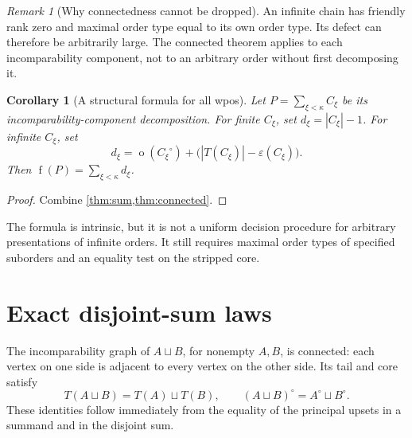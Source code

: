 \documentclass[11pt,a4paper]{article}
\newtheorem{corollary}[corollary]{Corollary}
\theoremstyle{definition}
\theoremstyle{remark}
\newtheorem{remark}[remark]{Remark}
\DeclareMathOperator{\mot}{o}
\DeclareMathOperator{\fot}{f}
\newcommand{\core}[1]{{#1}^{\circ}}
\newcommand{\ds}{\mathbin{\sqcup}}
\newcommand{\eps}{\varepsilon}
\begin{document}
\begin{remark}[Why connectedness cannot be dropped]
An infinite chain has friendly rank zero and maximal order type equal to
its own order type. Its defect can therefore be arbitrarily large. The
connected theorem applies to each incomparability component, not to an
arbitrary order without first decomposing it.
\end{remark}

\begin{corollary}[A structural formula for all wpos]\label{cor:all}
Let $P=\sum_{\xi<\kappa}C_\xi$ be its incomparability-component decomposition.
For finite $C_\xi$, set $d_\xi=|C_\xi|-1$. For infinite $C_\xi$, set
\[
d_\xi=\mot(\core{C_\xi})+
          \bigl(|T(C_\xi)|-\eps(C_\xi)\bigr).
\]
Then $\fot(P)=\sum_{\xi<\kappa}d_\xi$.
\end{corollary}
\begin{proof}
Combine \cref{thm:sum,thm:connected}.
\end{proof}

The formula is intrinsic, but it is not a uniform decision procedure for
arbitrary presentations of infinite orders. It still requires maximal order
types of specified suborders and an equality test on the stripped core.

\section{Exact disjoint-sum laws}\label{sec:disjoint}

The incomparability graph of $A\ds B$, for nonempty $A,B$, is connected:
each vertex on one side is adjacent to every vertex on the other side.
Its tail and core satisfy
\begin{equation}\label{eq:sumcore}
T(A\ds B)=T(A)\ds T(B),\qquad
\core{(A\ds B)}=\core{A}\ds\core{B}.
\end{equation}
These identities follow immediately from the equality of the principal
upsets in a summand and in the disjoint sum.
\end{document}

